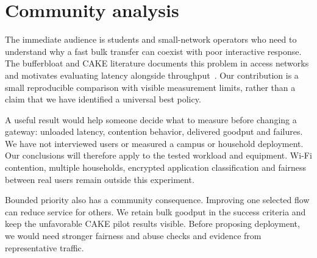 \section{Community analysis}
The immediate audience is students and small-network operators who need to
understand why a fast bulk transfer can coexist with poor interactive response.
The bufferbloat and CAKE literature documents this problem in access networks
and motivates evaluating latency alongside throughput~\cite{bufferbloat,cake}.
Our contribution is a small reproducible comparison with visible measurement
limits, rather than a claim that we have identified a universal best policy.

A useful result would help someone decide what to measure before changing a
gateway: unloaded latency, contention behavior, delivered goodput and failures.
We have not interviewed users or measured a campus or household deployment.
Our conclusions will therefore apply to the tested workload and equipment.
Wi-Fi contention, multiple households, encrypted application classification
and fairness between real users remain outside this experiment.

Bounded priority also has a community consequence. Improving one selected
flow can reduce service for others. We retain bulk goodput in the success
criteria and keep the unfavorable CAKE pilot results visible. Before proposing
deployment, we would need stronger fairness and abuse checks and evidence
from representative traffic.
